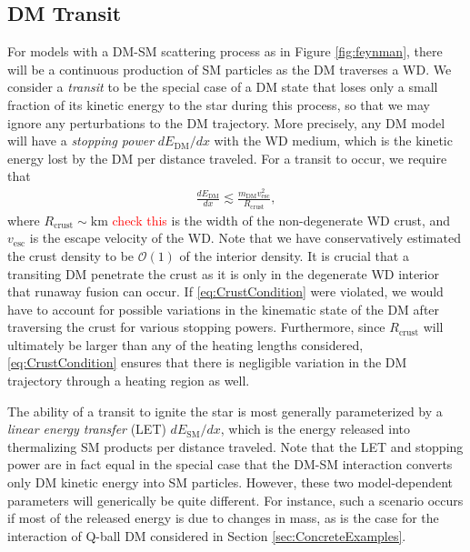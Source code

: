 \documentclass[twocolumn,showpacs,preprintnumbers,amsmath,amssymb,prd]{revtex4}
\newcommand{\OO}{\mathcal{O}}
\begin{document}
\subsection{DM Transit}
\label{sec:transit}
For models with a DM-SM scattering process as in Figure \ref{fig:feynman}, there will be a continuous production of SM particles as the DM traverses a WD.  We consider a \emph{transit} to be the special case of a DM state that loses only a small fraction of its kinetic energy to the star during this process, so that we may ignore any perturbations to the DM trajectory. More precisely, any DM model will have a \emph{stopping power} $d E_\text{DM}/d x$ with the WD medium, which is the kinetic energy lost by the DM per distance traveled.  For a transit to occur, we require that
\begin{align}
\frac{d E_\text{DM}}{d x} \lesssim \frac{m_\text{DM} v^2_\text{esc}}{R_\text{crust}},
\label{eq:CrustCondition}
\end{align}
where $R_\text{crust} \sim \text{km}$ \textcolor{red}{check this} is the width of the non-degenerate WD crust, and $v_\text{esc}$ is the escape velocity of the WD. Note that we have conservatively estimated the crust density to be $\OO(1)$ of the interior density. It is crucial that a transiting DM penetrate the crust as it is only in the degenerate WD interior that runaway fusion can occur.  If \eqref{eq:CrustCondition} were violated, we would have to account for possible variations in the kinematic state of the DM after traversing the crust for various stopping powers. Furthermore, since $R_\text{crust}$ will ultimately be larger than any of the heating lengths considered, \eqref{eq:CrustCondition} ensures that there is negligible variation in the DM trajectory through a heating region as well.

The ability of a transit to ignite the star is most generally parameterized by a \emph{linear energy transfer} (LET) $d E_\text{SM}/d x$, which is the energy released into thermalizing SM products per distance traveled. Note that the LET and stopping power are in fact equal in the special case that the DM-SM interaction converts only DM kinetic energy into SM particles. However, these two model-dependent parameters will generically be quite different. For instance, such a scenario occurs if most of the released energy is due to changes in mass, as is the case for the interaction of Q-ball DM considered in Section \ref{sec:ConcreteExamples}.
\end{document}
